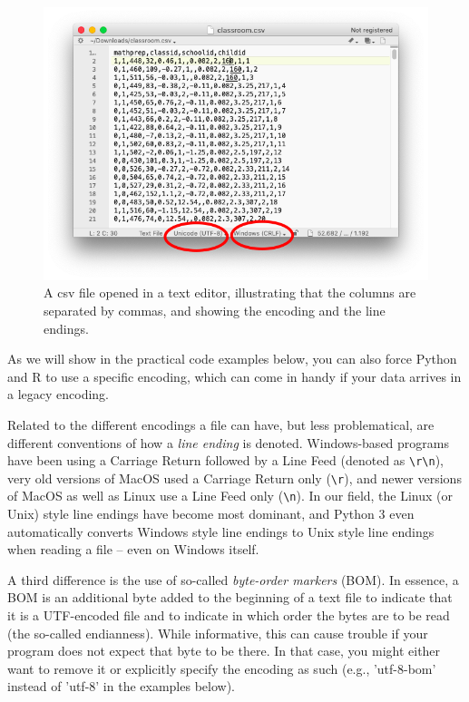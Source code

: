 \begin{figure}
\centering
\includegraphics[width=0.9\linewidth]{figures/ch6_csv-in-editor}
\caption{A csv file opened in a text editor, illustrating that the columns are separated by commas, and showing the encoding and the line endings.}
\label{fig:csv-in-editor}
\end{figure}

As we will show in the practical code examples below, you can also force Python and R to use a specific encoding, which can come in handy if your data arrives in a legacy encoding.

Related to the different encodings a file can have, but less problematical, are different conventions of how a \emph{line ending} is denoted. Windows-based programs have been using a Carriage Return followed by a Line Feed (denoted as \texttt{\textbackslash r\textbackslash n}), very old versions of MacOS used a Carriage Return only (\texttt{\textbackslash r}), and newer versions of MacOS as well as Linux use a Line Feed only (\texttt{\textbackslash n}). In our field, the Linux (or Unix) style line endings have become most dominant, and Python 3 even automatically converts Windows style line endings to Unix style line endings when reading a file -- even on Windows itself.

A third difference is the use of so-called \emph{byte-order markers} (BOM). In essence, a BOM is an additional byte added to the beginning of a text file to indicate that it is a UTF-encoded file and to indicate in which order the bytes are to be read (the so-called endianness). While informative, this can cause trouble if your program does not expect that byte to be there. In that case, you might either want to remove it or explicitly specify the encoding as such (e.g., 'utf-8-bom' instead of 'utf-8' in the examples below).


